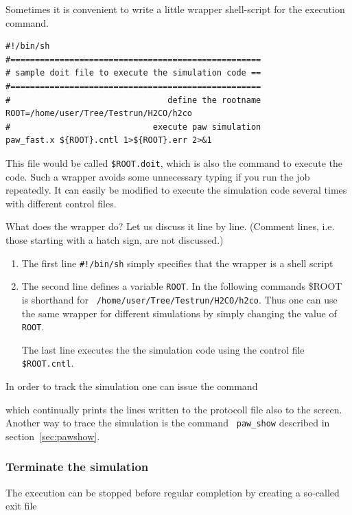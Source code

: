 \documentclass[final,12pt]{article}
\begin{document}
Sometimes it is convenient to write a little wrapper shell-script for
the execution command.
\begin{verbatim}
#!/bin/sh
#===================================================
# sample doit file to execute the simulation code ==
#===================================================
#                                define the rootname 
ROOT=/home/user/Tree/Testrun/H2CO/h2co                               
#                             execute paw simulation
paw_fast.x ${ROOT}.cntl 1>${ROOT}.err 2>&1
\end{verbatim}
This file would be called {\tt \${ROOT}.doit}, which is
also the command to execute the code.  Such a wrapper avoids some
unnecessary typing if you run the job repeatedly. It can easily be
modified to execute the simulation code several times with different
control files.

What does the wrapper do? Let us discuss it line by line. (Comment
lines, i.e. those starting with a hatch sign, are not discussed.)
\begin{enumerate}
\item The first line {\tt \#!/bin/sh} simply specifies that the
  wrapper is a shell script
\item The second line defines a variable {\tt ROOT}. In the following
  commands \${ROOT} is shorthand for {\tt
  /home/user/Tree/Testrun/H2CO/h2co}. Thus one can use the same
  wrapper for different simulations by simply changing the value of
  {\tt ROOT}.
\begin{sloppypar}
  The last line executes the the simulation code using the control
  file {\tt \${ROOT}.cntl}. 
\end{sloppypar}
\end{enumerate}

In order to track the simulation one can issue the command

\bigskip{}\bigskip

which continually prints the lines written to the protocoll file also
to the screen. Another way to trace the simulation is the command {\tt
paw\_show} described in section~\ref{sec:pawshow}.


\subsubsection{Terminate the simulation}

The execution can be stopped before regular completion by creating a
so-called exit file
\end{document}
